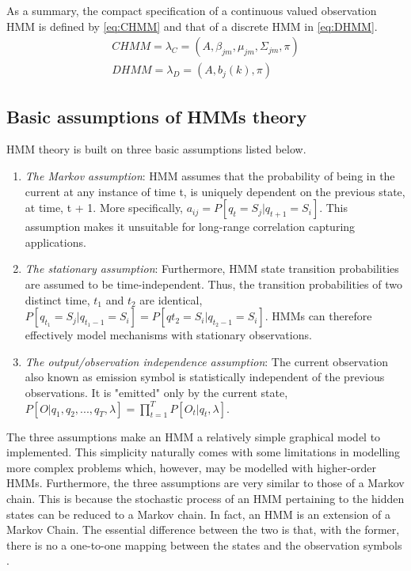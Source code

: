 As a summary, the compact specification of a continuous valued observation HMM is defined by \ref{eq:CHMM} and that of a discrete HMM in \ref{eq:DHMM}.
\begin{align} 
	CHMM = \lambda_C = (A, \beta_{jm}, \mu_{jm}, \Sigma_{jm}, \pi) \label{eq:CHMM} \\
	DHMM = \lambda_D = (A, b_j(k), \pi) \label{eq:DHMM}
\end{align}

\subsection{Basic assumptions of HMMs theory}
HMM theory is built on three basic assumptions listed below.
\begin{enumerate}
\label{con:markov} \item \textit{The Markov assumption}: HMM assumes that the probability of being in the current	at any instance of time t, is uniquely dependent on the previous state, at time, t + 1. More specifically, \(a_{ij} = P[q_t = S_j|q_{t+1}=S_i]\). This assumption makes it unsuitable for long-range correlation capturing applications.

\item \textit{The stationary assumption}: Furthermore, HMM state transition probabilities are assumed to be time-independent. Thus, the transition probabilities of two distinct time, \(t_1\) and \(t_2\) are identical, \(P[q_{t_1} = S_j|q_{t_1 -1} = S_i] = P[q{t_2}=S_i|q_{t_2-1} = S_i]\). HMMs can therefore effectively model mechanisms with stationary observations.

\item \textit{The output/observation independence assumption}: The current observation also known as emission symbol is statistically independent of the previous observations. It is "emitted" only by the current state, \(P[O|q_1, q_2, ..., q_T, \lambda]=\prod_{t=1}^{T}P[O_t|q_t, \lambda]\).
\end{enumerate} 
The three assumptions make an HMM a relatively simple graphical model to implemented. This simplicity naturally comes with some limitations in modelling more complex problems which, however, may be modelled with higher-order HMMs. %
Furthermore, the three assumptions are very similar to those of a Markov chain. This is because the stochastic process of an HMM pertaining to the hidden states can be reduced to a Markov chain. In fact, an HMM is an extension of a Markov Chain. The essential difference between the two is that, with the former, there is no a one-to-one mapping between the states and the observation symbols \cite{biol1998}.

